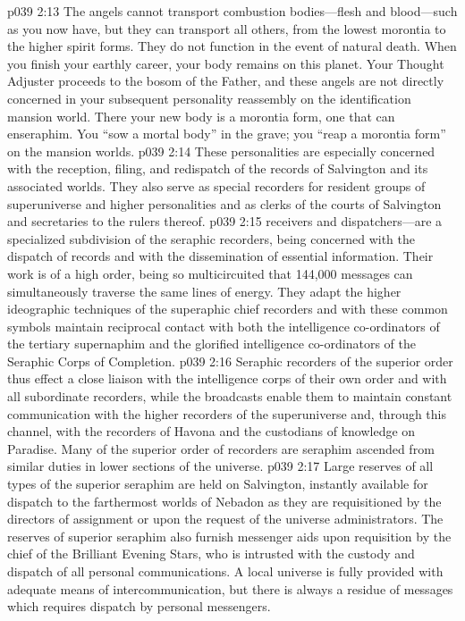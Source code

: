 \pc \vs p039 2:13 The angels cannot transport combustion bodies---flesh and blood---such as you now have, but they can transport all others, from the lowest morontia to the higher spirit forms. They do not function in the event of natural death. When you finish your earthly career, your body remains on this planet. Your Thought Adjuster proceeds to the bosom of the Father, and these angels are not directly concerned in your subsequent personality reassembly on the identification mansion world. There your new body is a morontia form, one that can enseraphim. You “sow a mortal body” in the grave; you “reap a morontia form” on the mansion worlds.
\pc \vs p039 2:14 \bibnobreakspace {} These personalities are especially concerned with the reception, filing, and redispatch of the records of Salvington and its associated worlds. They also serve as special recorders for resident groups of superuniverse and higher personalities and as clerks of the courts of Salvington and secretaries to the rulers thereof.
\pc \vs p039 2:15 receivers and dispatchers---are a specialized subdivision of the seraphic recorders, being concerned with the dispatch of records and with the dissemination of essential information. Their work is of a high order, being so multicircuited that 144,000 messages can simultaneously traverse the same lines of energy. They adapt the higher ideographic techniques of the superaphic chief recorders and with these common symbols maintain reciprocal contact with both the intelligence co\hyp{}ordinators of the tertiary supernaphim and the glorified intelligence co\hyp{}ordinators of the Seraphic Corps of Completion.
\vs p039 2:16 Seraphic recorders of the superior order thus effect a close liaison with the intelligence corps of their own order and with all subordinate recorders, while the broadcasts enable them to maintain constant communication with the higher recorders of the superuniverse and, through this channel, with the recorders of Havona and the custodians of knowledge on Paradise. Many of the superior order of recorders are seraphim ascended from similar duties in lower sections of the universe.
\pc \vs p039 2:17 \bibnobreakspace {} Large reserves of all types of the superior seraphim are held on Salvington, instantly available for dispatch to the farthermost worlds of Nebadon as they are requisitioned by the directors of assignment or upon the request of the universe administrators. The reserves of superior seraphim also furnish messenger aids upon requisition by the chief of the Brilliant Evening Stars, who is intrusted with the custody and dispatch of all personal communications. A local universe is fully provided with adequate means of intercommunication, but there is always a residue of messages which requires dispatch by personal messengers.
